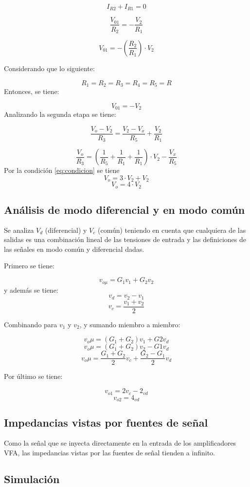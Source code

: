 \[I_{R2} + I_{R1} = 0 \]


\[\frac{V_{01}}{R_2} = -\frac{V_2}{R_1}\]


\[{V_{01}} = -(\frac{R_2}{R_1}) \cdot {V_2}\]

Considerando que lo siguiente:

\[{R_1}={R_2}={R_3}={R_4}={R_5}
      = {R}\]
Entonces, se tiene:
 
 
 \[{V_{01}} = -{V_2}\]
Analizando la segunda etapa se tiene:

\[\frac{V_o-V_2}{R_3}
      = \frac{V_2-V_x}{R_5}+\frac{V_2}{R_1}\]

\begin{equation}\label{eq:condicion} 
\frac{V_o}{R_3} = (\frac{1}{R_5}+\frac{1}{R_1}+\frac{1}{R_1}) \cdot {V_2}-\frac{V_x}{R_5}
\end{equation}
Por la condición \ref{eq:condicion} se tiene
  \[{V_o}=3 \cdot {V_2}+{V_2}\]
      \[{V_o}=4 \cdot {V_2}\]
      
\subsection{Análisis de modo diferencial y en modo común }

Se analiza $V_d$ (diferencial) y $V_c$ (común) teniendo en cuenta que cualquiera de las salidas es una combinación lineal de las tensiones de entrada y las definiciones de las señales en modo común y diferencial dadas.

Primero se tiene:

\[ v_{o\mu}= G_1 v_1 + G_2 v_2\]
y además se tiene:
\[{v_d}
      = {v_2-v_1}\]\[{v_c}
      = \frac{v_1+v_2}{2}\]

Combinando para \(v_1\) y \(v_2\), y sumando miembro a miembro:

\[v_o\mu= (G_1 + G_2)v_1 + G2 v_d \]
\[v_o\mu= (G_1 + G_2)v_2 - G1 v_d \]
\[v_o\mu= \frac{G_1 + G_2}{2}v_c + \frac{G_2-G_1}{2} v_d \]

Por último se tiene:

\[v_{o1}= 2v_c-2_{vd}\]
\[v_{o2}= 4_{vd}\]
\subsection{Impedancias vistas por fuentes de señal }

Como la señal que se inyecta directamente en la entrada de los amplificadores VFA, las impedancias vistas por las fuentes de señal tienden a infinito.
\newpage
\subsection{Simulación}

